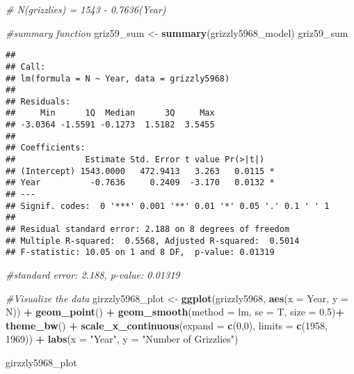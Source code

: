 \documentclass[]{article}
\newenvironment{Shaded}{\begin{snugshade}}{\end{snugshade}}
\newcommand{\KeywordTok}[1]{\textcolor[rgb]{0.13,0.29,0.53}{\textbf{#1}}}
\newcommand{\DataTypeTok}[1]{\textcolor[rgb]{0.13,0.29,0.53}{#1}}
\newcommand{\DecValTok}[1]{\textcolor[rgb]{0.00,0.00,0.81}{#1}}
\newcommand{\FloatTok}[1]{\textcolor[rgb]{0.00,0.00,0.81}{#1}}
\newcommand{\StringTok}[1]{\textcolor[rgb]{0.31,0.60,0.02}{#1}}
\newcommand{\CommentTok}[1]{\textcolor[rgb]{0.56,0.35,0.01}{\textit{#1}}}
\newcommand{\OperatorTok}[1]{\textcolor[rgb]{0.81,0.36,0.00}{\textbf{#1}}}
\newcommand{\NormalTok}[1]{#1}
\begin{document}
\begin{Shaded}
\begin{Highlighting}[]
\CommentTok{# N(grizzlies) = 1543 - 0.7636(Year)}

\CommentTok{#summary function}
\NormalTok{griz59_sum <-}\StringTok{ }\KeywordTok{summary}\NormalTok{(grizzly5968_model)}
\NormalTok{griz59_sum}
\end{Highlighting}
\end{Shaded}

\begin{verbatim}
## 
## Call:
## lm(formula = N ~ Year, data = grizzly5968)
## 
## Residuals:
##     Min      1Q  Median      3Q     Max 
## -3.0364 -1.5591 -0.1273  1.5182  3.5455 
## 
## Coefficients:
##              Estimate Std. Error t value Pr(>|t|)  
## (Intercept) 1543.0000   472.9413   3.263   0.0115 *
## Year          -0.7636     0.2409  -3.170   0.0132 *
## ---
## Signif. codes:  0 '***' 0.001 '**' 0.01 '*' 0.05 '.' 0.1 ' ' 1
## 
## Residual standard error: 2.188 on 8 degrees of freedom
## Multiple R-squared:  0.5568, Adjusted R-squared:  0.5014 
## F-statistic: 10.05 on 1 and 8 DF,  p-value: 0.01319
\end{verbatim}

\begin{Shaded}
\begin{Highlighting}[]
\CommentTok{#standard error: 2.188,  p-value: 0.01319}

\CommentTok{#Visualize the data}
\NormalTok{girzzly5968_plot <-}\StringTok{ }\KeywordTok{ggplot}\NormalTok{(grizzly5968, }\KeywordTok{aes}\NormalTok{(}\DataTypeTok{x =}\NormalTok{ Year, }\DataTypeTok{y =}\NormalTok{ N)) }\OperatorTok{+}
\StringTok{  }\KeywordTok{geom_point}\NormalTok{() }\OperatorTok{+}
\StringTok{  }\KeywordTok{geom_smooth}\NormalTok{(}\DataTypeTok{method =}\NormalTok{ lm, }\DataTypeTok{se =}\NormalTok{ T, }\DataTypeTok{size =} \FloatTok{0.5}\NormalTok{)}\OperatorTok{+}
\StringTok{  }\KeywordTok{theme_bw}\NormalTok{() }\OperatorTok{+}
\StringTok{  }\KeywordTok{scale_x_continuous}\NormalTok{(}\DataTypeTok{expand =} \KeywordTok{c}\NormalTok{(}\DecValTok{0}\NormalTok{,}\DecValTok{0}\NormalTok{), }\DataTypeTok{limits =} \KeywordTok{c}\NormalTok{(}\DecValTok{1958}\NormalTok{, }\DecValTok{1969}\NormalTok{)) }\OperatorTok{+}
\StringTok{  }\KeywordTok{labs}\NormalTok{(}\DataTypeTok{x =} \StringTok{"Year"}\NormalTok{, }\DataTypeTok{y =} \StringTok{"Number of Grizzlies"}\NormalTok{)}


\NormalTok{girzzly5968_plot}
\end{Highlighting}
\end{Shaded}
\end{document}
